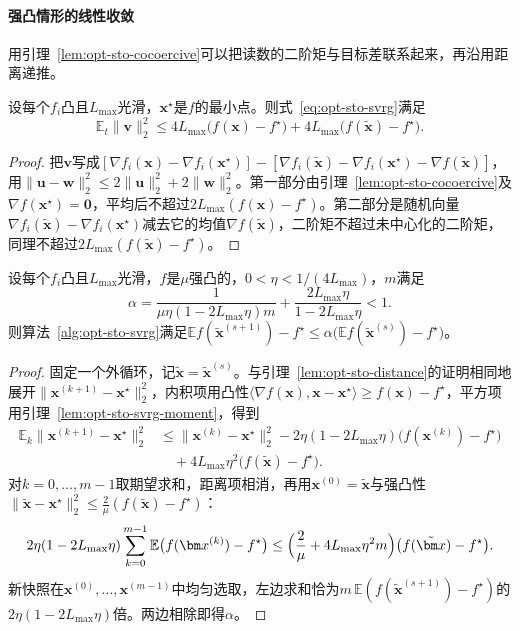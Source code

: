 \paragraph{强凸情形的线性收敛}
用引理~\ref{lem:opt-sto-cocoercive}可以把读数的二阶矩与目标差联系起来，再沿用距离递推。

\begin{lemma}[SVRG读数的二阶矩]
\label{lem:opt-sto-svrg-moment}
设每个$f_i$凸且$L_{\max}$光滑，$\bm x^\star$是$f$的最小点。则式~\eqref{eq:opt-sto-svrg}满足
\[
  \mathbb E_t\lVert\bm v\rVert_2^2\leq4L_{\max}\bigl(f(\bm x)-f^\star\bigr)+4L_{\max}\bigl(f(\tilde{\bm x})-f^\star\bigr).
\]
\end{lemma}

\begin{proof}
把$\bm v$写成$[\nabla f_i(\bm x)-\nabla f_i(\bm x^\star)]-[\nabla f_i(\tilde{\bm x})-\nabla f_i(\bm x^\star)-\nabla f(\tilde{\bm x})]$，用$\lVert\bm u-\bm w\rVert_2^2\leq2\lVert\bm u\rVert_2^2+2\lVert\bm w\rVert_2^2$。第一部分由引理~\ref{lem:opt-sto-cocoercive}及$\nabla f(\bm x^\star)=\bm0$，平均后不超过$2L_{\max}(f(\bm x)-f^\star)$。第二部分是随机向量$\nabla f_i(\tilde{\bm x})-\nabla f_i(\bm x^\star)$减去它的均值$\nabla f(\tilde{\bm x})$，二阶矩不超过未中心化的二阶矩，同理不超过$2L_{\max}(f(\tilde{\bm x})-f^\star)$。
\end{proof}

\begin{theorem}[SVRG的线性收敛]
\label{thm:opt-sto-svrg}
设每个$f_i$凸且$L_{\max}$光滑，$f$是$\mu$强凸的，$0<\eta<1/(4L_{\max})$，$m$满足
\[
  \alpha=\frac{1}{\mu\eta(1-2L_{\max}\eta)m}+\frac{2L_{\max}\eta}{1-2L_{\max}\eta}<1 .
\]
则算法~\ref{alg:opt-sto-svrg}满足$\mathbb Ef(\tilde{\bm x}^{(s+1)})-f^\star\leq\alpha\bigl(\mathbb Ef(\tilde{\bm x}^{(s)})-f^\star\bigr)$。
\end{theorem}

\begin{proof}
固定一个外循环，记$\tilde{\bm x}=\tilde{\bm x}^{(s)}$。与引理~\ref{lem:opt-sto-distance}的证明相同地展开$\lVert\bm x^{(k+1)}-\bm x^\star\rVert_2^2$，内积项用凸性$\langle\nabla f(\bm x),\bm x-\bm x^\star\rangle\geq f(\bm x)-f^\star$，平方项用引理~\ref{lem:opt-sto-svrg-moment}，得到
\[
  \begin{aligned}
    \mathbb E_k\lVert\bm x^{(k+1)}-\bm x^\star\rVert_2^2
    &\leq\lVert\bm x^{(k)}-\bm x^\star\rVert_2^2-2\eta(1-2L_{\max}\eta)\bigl(f(\bm x^{(k)})-f^\star\bigr)\\
    &\quad+4L_{\max}\eta^2\bigl(f(\tilde{\bm x})-f^\star\bigr).
  \end{aligned}
\]
对$k=0,\dots,m-1$取期望求和，距离项相消，再用$\bm x^{(0)}=\tilde{\bm x}$与强凸性$\lVert\tilde{\bm x}-\bm x^\star\rVert_2^2\leq\tfrac2\mu(f(\tilde{\bm x})-f^\star)$：
\[
  2\eta(1-2L_{\max}\eta)\sum_{k=0}^{m-1}\mathbb E\bigl(f(\bm x^{(k)})-f^\star\bigr)\leq\Bigl(\frac2\mu+4L_{\max}\eta^2m\Bigr)\bigl(f(\tilde{\bm x})-f^\star\bigr).
\]
新快照在$\bm x^{(0)},\dots,\bm x^{(m-1)}$中均匀选取，左边求和恰为$m\,\mathbb E(f(\tilde{\bm x}^{(s+1)})-f^\star)$的$2\eta(1-2L_{\max}\eta)$倍。两边相除即得$\alpha$。
\end{proof}

